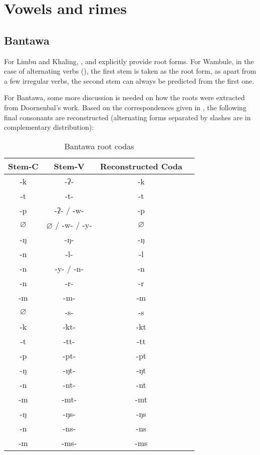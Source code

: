 \documentclass[oldfontcommands,oneside,a4paper,11pt]{article}
\newcommand{\ipa}[1]{{\phon\mbox{#1}}} %
\begin{document}
\section{Vowels and rimes} \label{sec:rhymes}

\subsection{Bantawa} \label{sec:bantawa}
 
 For Limbu and Khaling, \citet{michailovsky02dico}, \citet{jacques12khaling} and \citet{jacques16si} explicitly provide root forms. For Wambule, in the case of alternating verbs (\citealt[255-263]{opgenort04wambule}), the first stem is taken as the root form, as apart from a few irregular verbs, the second stem can always be predicted from the first one.  
 
 For Bantawa, some more discussion is needed on how the roots were extracted from Doornenbal's work. Based on the correspondences given in \citet[129; 132]{doornenbal09}, the following final consonants are reconstructed (alternating forms separated by slashes are in complementary distribution):

\begin{table}[H]
\caption{Bantawa root codas} \centering \label{tab:bantawa.root}
\begin{tabular}{cccc}
\toprule
Stem-C & Stem-V & Reconstructed Coda \\
\midrule
\ipa{-k} & \ipa{-ʔ-} & \ipa{-k} \\
\ipa{-t} & \ipa{-t-} & \ipa{-t} \\
\ipa{-p} & \ipa{-ʔ-} /  \ipa{-w-} & \ipa{-p} \\
$\varnothing$ & $\varnothing$ / \ipa{-w-} / \ipa{-y-} & $\varnothing$ \\
\ipa{-ŋ} & \ipa{-ŋ-} & \ipa{-ŋ} \\
\ipa{-n} & \ipa{-l-} & \ipa{-l} \\
\ipa{-n} & \ipa{-y-} / \ipa{-n-}& \ipa{-n} \\
\ipa{-n} & \ipa{-r-} & \ipa{-r} \\
\ipa{-m} & \ipa{-m-} & \ipa{-m} \\
$\varnothing$ & \ipa{-s-} & \ipa{-s} \\
\midrule
\ipa{-k} & \ipa{-kt-} & \ipa{-kt} \\
\ipa{-t} & \ipa{-tt-} & \ipa{-tt} \\
\ipa{-p} & \ipa{-pt-} & \ipa{-pt} \\
\ipa{-ŋ} & \ipa{-ŋt-} & \ipa{-ŋt} \\
\ipa{-n} & \ipa{-nt-} & \ipa{-nt} \\
\ipa{-m} & \ipa{-mt-} & \ipa{-mt} \\
\midrule
\ipa{-ŋ} & \ipa{-ŋs-} & \ipa{-ŋs}  \\
\ipa{-n} & \ipa{-ns-} & \ipa{-ns} \\
\ipa{-m} & \ipa{-ms-} & \ipa{-ms}   \\
\bottomrule
\end{tabular}
\end{table}
\end{document}
